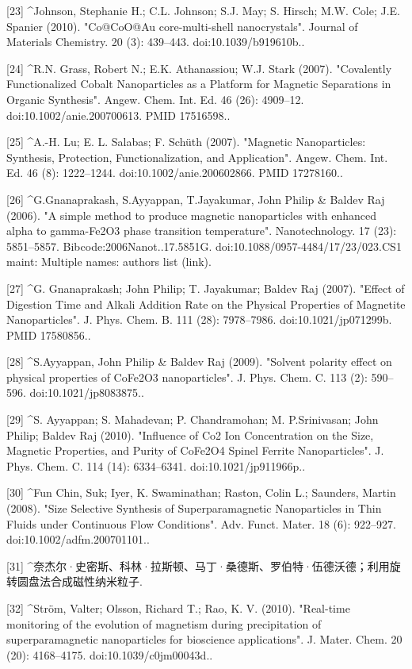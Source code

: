[23]
^Johnson, Stephanie H.; C.L. Johnson; S.J. May; S. Hirsch; M.W. Cole; J.E. Spanier (2010). "Co@CoO@Au core-multi-shell nanocrystals". Journal of Materials Chemistry. 20 (3): 439–443. doi:10.1039/b919610b..

[24]
^R.N. Grass, Robert N.; E.K. Athanassiou; W.J. Stark (2007). "Covalently Functionalized Cobalt Nanoparticles as a Platform for Magnetic Separations in Organic Synthesis". Angew. Chem. Int. Ed. 46 (26): 4909–12. doi:10.1002/anie.200700613. PMID 17516598..

[25]
^A.-H. Lu; E. L. Salabas; F. Schüth (2007). "Magnetic Nanoparticles: Synthesis, Protection, Functionalization, and Application". Angew. Chem. Int. Ed. 46 (8): 1222–1244. doi:10.1002/anie.200602866. PMID 17278160..

[26]
^G.Gnanaprakash, S.Ayyappan, T.Jayakumar, John Philip & Baldev Raj (2006). "A simple method to produce magnetic nanoparticles with enhanced alpha to gamma-Fe2O3 phase transition temperature". Nanotechnology. 17 (23): 5851–5857. Bibcode:2006Nanot..17.5851G. doi:10.1088/0957-4484/17/23/023.CS1 maint: Multiple names: authors list (link).

[27]
^G. Gnanaprakash; John Philip; T. Jayakumar; Baldev Raj (2007). "Effect of Digestion Time and Alkali Addition Rate on the Physical Properties of Magnetite Nanoparticles". J. Phys. Chem. B. 111 (28): 7978–7986. doi:10.1021/jp071299b. PMID 17580856..

[28]
^S.Ayyappan, John Philip & Baldev Raj (2009). "Solvent polarity effect on physical properties of CoFe2O3 nanoparticles". J. Phys. Chem. C. 113 (2): 590–596. doi:10.1021/jp8083875..

[29]
^S. Ayyappan; S. Mahadevan; P. Chandramohan; M. P.Srinivasan; John Philip; Baldev Raj (2010). "Influence of Co2 Ion Concentration on the Size, Magnetic Properties, and Purity of CoFe2O4 Spinel Ferrite Nanoparticles". J. Phys. Chem. C. 114 (14): 6334–6341. doi:10.1021/jp911966p..

[30]
^Fun Chin, Suk; Iyer, K. Swaminathan; Raston, Colin L.; Saunders, Martin (2008). "Size Selective Synthesis of Superparamagnetic Nanoparticles in Thin Fluids under Continuous Flow Conditions". Adv. Funct. Mater. 18 (6): 922–927. doi:10.1002/adfm.200701101..

[31]
^奈杰尔·史密斯、科林·拉斯顿、马丁·桑德斯、罗伯特·伍德沃德；利用旋转圆盘法合成磁性纳米粒子.

[32]
^Ström, Valter; Olsson, Richard T.; Rao, K. V. (2010). "Real-time monitoring of the evolution of magnetism during precipitation of superparamagnetic nanoparticles for bioscience applications". J. Mater. Chem. 20 (20): 4168–4175. doi:10.1039/c0jm00043d..

